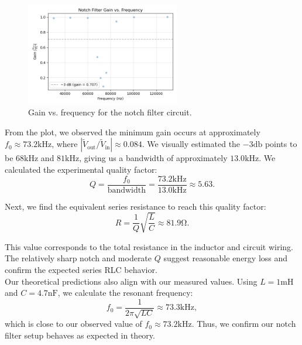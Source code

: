 \documentclass{article}
\begin{document}
\begin{figure}[H]
    \centering
    \includegraphics[width=0.6\textwidth]{3.ca.png}
    \caption{Gain vs. frequency for the notch filter circuit.}
    \label{fig:notch_gain}
\end{figure}

\noindent From the plot, we observed the minimum gain occurs at approximately $f_0\approx 73.2\si{\kilo\hertz}$,
where $|\widetilde{V}_\text{out} / \widetilde{V}_\text{in}|\approx 0.084$. We visually
estimated the $-3\si{\decibel}$ points to be $68\si{\kilo\hertz}$ and $81\si{\kilo\hertz}$,
giving us a bandwidth of approximately $13.0\si{\kilo\hertz}$. We calculated the experimental
quality factor:
\begin{equation}
    Q=\frac{f_0}{\text{bandwidth}}=\frac{73.2\si{\kilo\hertz}}{13.0\si{\kilo\hertz}}\approx 5.63.
\end{equation}

\noindent Next, we find the equivalent series resistance to reach this quality factor:
\begin{equation}
    R=\frac{1}{Q} \sqrt{\frac{L}{C}} \approx 81.9\si{\ohm}.
\end{equation}

\noindent This value corresponds to the total resistance in the inductor and circuit wiring.
The relatively sharp notch and moderate $Q$ suggest reasonable energy loss and 
confirm the expected series RLC behavior.\\

\noindent Our theoretical predictions also align with our measured values. 
Using $L = 1\si{\milli\henry}$ and $C = 4.7\si{\nano\farad}$, we calculate the 
resonant frequency:
\begin{equation}
    f_0 = \frac{1}{2\pi\sqrt{LC}} \approx 73.3\si{\kilo\hertz},
\end{equation}
which is close to our observed value of $f_0 \approx 73.2\si{\kilo\hertz}$. 
Thus, we confirm our notch filter setup behaves as expected in theory.
\end{document}
